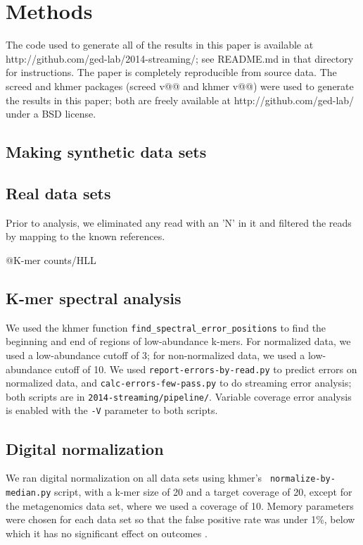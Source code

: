 \documentclass{article}
\begin{document}
\section{Methods}

The code used to generate all of the results in this paper is
available at http://github.com/ged-lab/2014-streaming/; see README.md
in that directory for instructions.  The paper is completely
reproducible from source data.  The screed and khmer packages (screed
v@@ and khmer v@@) were used to generate the results in this paper;
both are freely available at http://github.com/ged-lab/ under a BSD
license.

\subsection{Making synthetic data sets}

\subsection{Real data sets}

Prior to analysis, we eliminated any read with an 'N' in it and
filtered the reads by mapping to the known references.

@K-mer counts/HLL

\subsection{K-mer spectral analysis}

We used the khmer function {\tt find\_spectral\_error\_positions} to find
the beginning and end of regions of low-abundance k-mers.  For
normalized data, we used a low-abundance cutoff of 3; for
non-normalized data, we used a low-abundance cutoff of 10.  We used
{\tt report-errors-by-read.py} to predict errors on normalized data,
and {\tt calc-errors-few-pass.py} to do streaming error analysis; both
scripts are in {\tt 2014-streaming/pipeline/}.  Variable coverage error
analysis is enabled with the {\tt -V} parameter to both scripts.

\subsection{Digital normalization}

We ran digital normalization on all data sets using khmer's {\tt
  normalize-by-median.py} script, with a k-mer size of 20 and a target
coverage of 20, except for the metagenomics data set, where we used a
coverage of 10.  Memory parameters were chosen for each data set so
that the false positive rate was under 1\%, below which it has
no significant effect on outcomes \cite{Zhang2014}.
\end{document}
